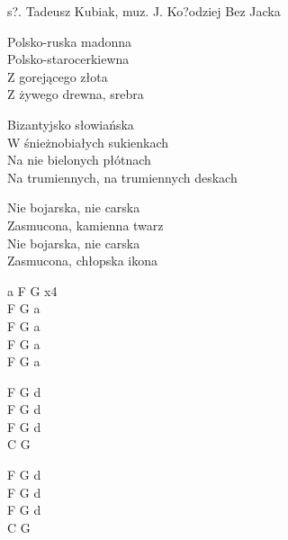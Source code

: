 {s?. Tadeusz Kubiak, muz. J. Ko?odziej}
{Bez Jacka}
\begin{text}
    \hfill\break
    Polsko-ruska madonna\\
    Polsko-starocerkiewna\\
    Z gorejącego złota\\
    Z żywego drewna, srebra

    Bizantyjsko słowiańska\\
    W śnieżnobiałych sukienkach\\
    Na nie bielonych płótnach\\
    Na trumiennych, na trumiennych deskach

    Nie bojarska, nie carska\\
    Zasmucona, kamienna twarz\\
    Nie bojarska, nie carska\\
    Zasmucona, chłopska ikona
\end{text}
\begin{chord}
    a F G x4\\
    F G a\\
    F G a\\
    F G a\\
    F G a

    F G d\\
    F G d\\
    F G d\\
    C G

    F G d\\
    F G d\\
    F G d\\
    C G
\end{chord}